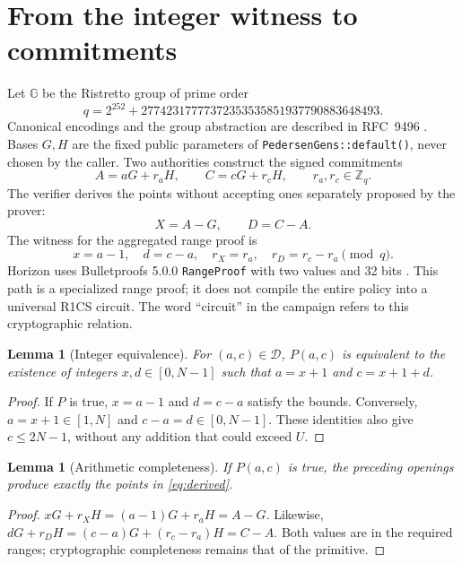 \documentclass[11pt,a4paper]{article}
\newtheorem{lemma}[theorem]{Lemma}
\newcommand{\code}[1]{\nolinkurl{#1}}
\newcommand{\Zq}{\mathbb Z_q}
\begin{document}
\section{From the integer witness to commitments}
Let $\mathbb G$ be the Ristretto group of prime order
\[
 q=2^{252}+27742317777372353535851937790883648493.
\]
Canonical encodings and the group abstraction are described in
RFC~9496 \cite{ristretto}. Bases $G,H$ are the fixed public parameters
of \code{PedersenGens::default()}, never chosen by the caller. Two
authorities construct the signed commitments
\[
 A=aG+r_aH,\qquad C=cG+r_cH,\qquad r_a,r_c\in\Zq.
\]
The verifier derives the points without accepting ones separately proposed
by the prover:
\begin{equation}\label{eq:derived}
 X=A-G,\qquad D=C-A.
\end{equation}
The witness for the aggregated range proof is
\[
 x=a-1,\quad d=c-a,\quad r_X=r_a,\quad r_D=r_c-r_a\pmod q.
\]
Horizon uses Bulletproofs 5.0.0 \code{RangeProof} with two values and
32 bits \cite{rangeapi}. This path is a specialized range proof;
it does not compile the entire policy into a universal R1CS circuit.
The word ``circuit'' in the campaign refers to this cryptographic relation.

\begin{lemma}[Integer equivalence]
For $(a,c)\in\mathcal D$, $P(a,c)$ is equivalent to the existence of
integers $x,d\in[0,N-1]$ such that $a=x+1$ and $c=x+1+d$.
\end{lemma}
\begin{proof}
If $P$ is true, $x=a-1$ and $d=c-a$ satisfy the bounds. Conversely,
$a=x+1\in[1,N]$ and $c-a=d\in[0,N-1]$. These identities also give
$c\le2N-1$, without any addition that could exceed $U$.
\end{proof}

\begin{lemma}[Arithmetic completeness]
If $P(a,c)$ is true, the preceding openings produce exactly
the points in \eqref{eq:derived}.
\end{lemma}
\begin{proof}
$xG+r_XH=(a-1)G+r_aH=A-G$. Likewise,
$dG+r_DH=(c-a)G+(r_c-r_a)H=C-A$. Both values are in the required
ranges; cryptographic completeness remains that of the primitive.
\end{proof}
\end{document}
